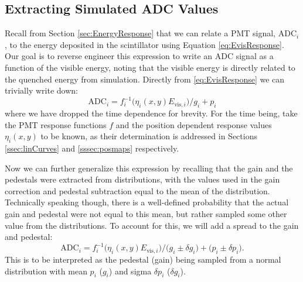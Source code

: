 \subsection{Extracting Simulated ADC Values}


Recall from Section \ref{sec:EnergyResponse} that we can relate a PMT signal,
$\mathrm{ADC}_i$, to the energy deposited in the scintillator
using Equation \ref{eq:EvisResponse}.
Our goal is to reverse engineer this expression to write an ADC signal as a
function of the visible energy, noting that the visible energy is directly
related to the quenched energy from simulation. Directly from \ref{eq:EvisResponse}
we can trivially write down:
%
\begin{equation} \label{eq:pmtResponse}
\mathrm{ADC}_i = f_i^{-1}\big(\eta_i(x,y) E_{\mathrm{vis},i} \big)/g_i + p_i
\end{equation}
%
where we have dropped the time dependence for brevity. For the time being, take
the PMT response functions $f$ and the position dependent response values $\eta_i(x,y)$ to be known,
as their determination is addressed in Sections \ref{ssec:linCurves} and \ref{sssec:posmaps}
respectively.

Now we can further generalize this expression by recalling that the gain and the pedestals
were extracted from distributions, with the values used in the gain correction and pedestal
subtraction equal to the mean of the distribution. Technically speaking though, there is a
well-defined probability that the actual gain and pedestal were not equal to this mean, but rather
sampled some other value from the distributions. To account for this, we will add a spread
to the gain and pedestal:
%
\begin{equation} 
  \mathrm{ADC}_i = f_i^{-1}\big(\eta_i(x,y)  E_{\mathrm{vis},i} \big)/\big(g_i\pm\delta g_i\big) + \big(p_i \pm \delta p_i\big).
  \label{eq:pmtResponse}
\end{equation}
%
This is to be interpreted as the pedestal (gain) being sampled from a normal
distribution with mean $p_i$ ($g_i$) and sigma $\delta p_i$ ($\delta g_i$).

